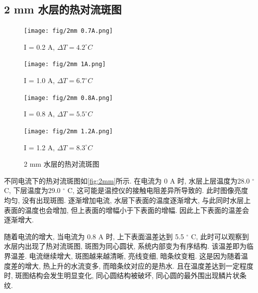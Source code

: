 \documentclass[font=default]{mpltx}
\begin{document}
  \subsection{2 mm 水层的热对流斑图}
    \begin{figure}[htbp]      
      \caption{2 mm 水层的热对流斑图}
      \begin{minipage}{0.32\linewidth}
        \vspace{3pt}
        \centerline{\texttt{[image: fig/2mm 0.7A.png]}}
        \centerline{I = 0.2 A, $\Delta T = 4.2^\circ C$}
        \vspace{3pt}
        \centerline{\texttt{[image: fig/2mm 1A.png]}}
        \centerline{I = 1.0 A, $\Delta T = 6.7^\circ C$}
      \end{minipage}
      \begin{minipage}{0.32\linewidth}
        \vspace{3pt}
        \centerline{\texttt{[image: fig/2mm 0.8A.png]}}
        \centerline{I = 0.8 A, $\Delta T = 5.5^\circ C$}
        \vspace{3pt}
        \centerline{\texttt{[image: fig/2mm 1.2A.png]}}
        \centerline{I = 1.2 A, $\Delta T = 8.3^\circ C$}
      \end{minipage}
      \label{fig:2mm}
    \end{figure}
  不同电流下的热对流斑图如\autoref{fig:2mm}所示.
  在电流为 0 A 时, 水层上层温度为28.0 $^\circ$ C, 下层温度为29.0 $^\circ$ C, 这可能是温控仪的接触电阻差异所导致的. 此时图像亮度均匀, 没有出现斑图.
  逐渐增加电流, 水层下表面的温度逐渐增大, 与此同时水层上表面的温度也会增加, 但上表面的增幅小于下表面的增幅. 因此上下表面的温差会逐渐增大.
  \par
  随着电流的增大, 当电流为 0.8 A 时, 上下表面温差达到 5.5 $^\circ$ C, 此时可以观察到水层内出现了热对流斑图, 斑图为同心圆状, 系统内部变为有序结构. 该温差即为临界温差.
  电流继续增大, 斑图越来越清晰, 亮线变细, 暗条纹变粗. 这是因为随着温度差的增大, 热上升的水流变多, 而暗条纹对应的是热水.
  且在温度差达到一定程度时, 斑图结构会发生明显变化, 同心圆结构被破坏, 同心圆的最外围出现鳞片状条纹.
\end{document}
